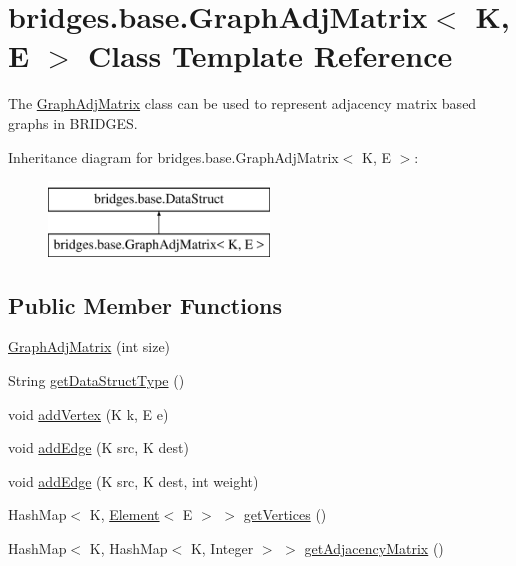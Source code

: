 \hypertarget{classbridges_1_1base_1_1_graph_adj_matrix}{}\section{bridges.\+base.\+Graph\+Adj\+Matrix$<$ K, E $>$ Class Template Reference}
\label{classbridges_1_1base_1_1_graph_adj_matrix}


The \hyperlink{classbridges_1_1base_1_1_graph_adj_matrix}{Graph\+Adj\+Matrix} class can be used to represent adjacency matrix based graphs in B\+R\+I\+D\+G\+ES.  


Inheritance diagram for bridges.\+base.\+Graph\+Adj\+Matrix$<$ K, E $>$\+:\begin{figure}[H]
\begin{center}
\leavevmode
\includegraphics[height=2.000000cm]{classbridges_1_1base_1_1_graph_adj_matrix}
\end{center}
\end{figure}
\subsection*{Public Member Functions}
\begin{DoxyCompactItemize}
\item 
\hyperlink{classbridges_1_1base_1_1_graph_adj_matrix_aaf71e89e2239d42f3ef37570665fb49d}{Graph\+Adj\+Matrix} (int size)
\item 
String \hyperlink{classbridges_1_1base_1_1_graph_adj_matrix_aa837a6bd0afbc700bf6277a062c5fdae}{get\+Data\+Struct\+Type} ()
\item 
void \hyperlink{classbridges_1_1base_1_1_graph_adj_matrix_a67d24d2ae069a8e1de6179ed58d7bca5}{add\+Vertex} (K k, E e)
\item 
void \hyperlink{classbridges_1_1base_1_1_graph_adj_matrix_ae4efc51cb444527f3915af5a45f73474}{add\+Edge} (K src, K dest)
\item 
void \hyperlink{classbridges_1_1base_1_1_graph_adj_matrix_af028f90cb574845cdddf9e5ec05130f8}{add\+Edge} (K src, K dest, int weight)
\item 
Hash\+Map$<$ K, \hyperlink{classbridges_1_1base_1_1_element}{Element}$<$ E $>$ $>$ \hyperlink{classbridges_1_1base_1_1_graph_adj_matrix_ac8270b3cbc4cf5f2f03c555ac6055423}{get\+Vertices} ()
\item 
Hash\+Map$<$ K, Hash\+Map$<$ K, Integer $>$ $>$ \hyperlink{classbridges_1_1base_1_1_graph_adj_matrix_a2bf0bf69333497b3b97788b74fe1f5b7}{get\+Adjacency\+Matrix} ()
\end{DoxyCompactItemize}
